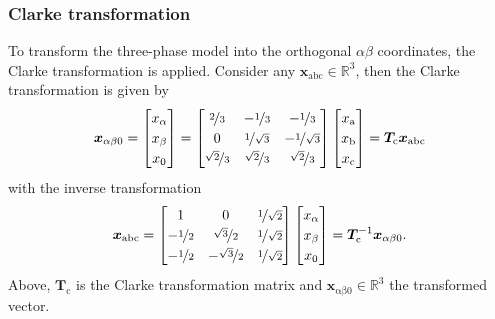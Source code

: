 \begin{frame}
	\frametitle{Clarke transformation}
    To transform the three-phase model into the orthogonal $\alpha\beta$ coordinates, the Clarke transformation is applied. Consider any $\bm{x}_\mathrm{abc}\in\mathbb{R}^3$, then the Clarke transformation is given by
    \begin{equation}
        \renewcommand{\arraystretch}{1.2}
        \bm{x}_{\alpha \beta0} = \begin{bmatrix} x_\alpha \\ x_\beta \\ x_0\end{bmatrix} = \begin{bmatrix}
            \nicefrac{2}{3} & -\nicefrac{1}{3} & -\nicefrac{1}{3}\\
            0 & \nicefrac{1}{\sqrt{3}} & -\nicefrac{1}{\sqrt{3}}\\
            \nicefrac{\sqrt{2}}{3} & \nicefrac{\sqrt{2}}{3} & \nicefrac{\sqrt{2}}{3}
        \end{bmatrix} \begin{bmatrix} x_\mathrm{a} \\ x_\mathrm{b} \\ x_\mathrm{c}\end{bmatrix} = \bm{T}_\mathrm{c} \bm{x}_\mathrm{abc} 
        \label{eq:Clarke_transformation}
    \end{equation}
    with the inverse transformation
    \begin{equation}
        \renewcommand{\arraystretch}{1.2}
        \bm{x}_\mathrm{abc}  = \begin{bmatrix}
            1 & 0 & \nicefrac{1}{\sqrt{2}}\\
            -\nicefrac{1}{2} & \nicefrac{\sqrt{3}}{2} & \nicefrac{1}{\sqrt{2}}\\
            -\nicefrac{1}{2} & -\nicefrac{\sqrt{3}}{2} & \nicefrac{1}{\sqrt{2}}
        \end{bmatrix} \begin{bmatrix} x_\alpha \\ x_\beta \\ x_0\end{bmatrix} = \bm{T}_\mathrm{c}^{-1} \bm{x}_{\alpha \beta 0}.
    \end{equation}
    Above, $\bm{T}_\mathrm{c}$ is the Clarke transformation matrix and $\bm{x}_\mathrm{\alpha \beta0}\in\mathbb{R}^3$ the transformed vector.
\end{frame}


